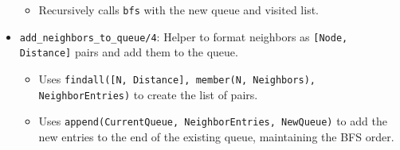 \documentclass[12pt,a4paper]{article}
\begin{document}
\begin{itemize}
\begin{itemize}
                \item Recursively calls \texttt{bfs} with the new queue and visited list.
        \end{itemize}
     \item \texttt{add\_neighbors\_to\_queue/4}: Helper to format neighbors as \texttt{[Node, Distance]} pairs and add them to the queue.
        \begin{itemize}
            \item Uses \texttt{findall([N, Distance], member(N, Neighbors), NeighborEntries)} to create the list of pairs.
            \item Uses \texttt{append(CurrentQueue, NeighborEntries, NewQueue)} to add the new entries to the end of the existing queue, maintaining the BFS order.
        \end{itemize}
\end{itemize}
\end{document}
